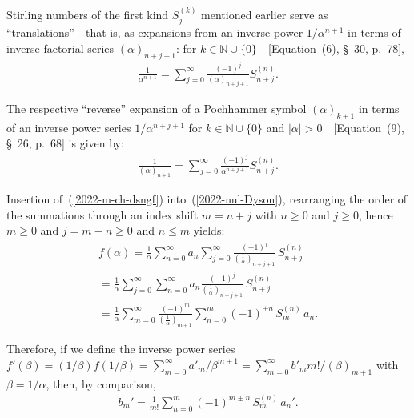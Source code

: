\documentclass[axioms,article,accept,oneauthor,pdftex]{Definitions/mdpi}
\begin{document}
Stirling numbers of the first kind ${S}_j^{(k)}$ mentioned earlier
serve as ``translations''---that is, as expansions from
an  inverse  power ${1}/{ \alpha ^{n+1}}$ in terms of  inverse  factorial series $( \alpha )_{n+j+1}$:
for $k  \in \mathbb{N} \cup \{0\}$~\cite{Nielsen-Gammafunktion}~[Equation~(6), \S~30, p.~78],
\begin{equation}
\begin{split}
\frac{1}{ \alpha ^{n+1}}  = \sum_{j=0}^\infty \frac{(-1)^j}{( \alpha )_{n+j+1}} {S}_{n+j}^{(n)}
.
\end{split}
\label{2022-m-ch-dsngf}
\end{equation}

The respective ``reverse'' expansion of a Pochhammer symbol $( \alpha )_{k+1}$ in terms of  an inverse power series
${1}/{ \alpha ^{n+j+1}}$
for $k  \in \mathbb{N} \cup \{0\}$ and $\vert \alpha \vert >0$~\cite{Nielsen-Gammafunktion}~[Equation~(9), \S~26, p.~68]
is given by:
\begin{equation}
\begin{split}
\frac{1}{( \alpha )_{n+1}}  = \sum_{j=0}^\infty \frac{(-1)^j}{\alpha^{n+j+1}} {S}_{n+j}^{(n)}
.
\end{split}
\label{2022-m-ch-dsngfinverse}
\end{equation}



Insertion of~(\ref{2022-m-ch-dsngf})  into~(\ref{2022-nul-Dyson}), rearranging the order of the summations through an index shift $m = n+j$
 with $n \ge 0$  and $j \ge 0$, hence  $m \ge 0$ and $j = m - n \ge 0$ and $n \le m$     yields:
\begin{equation}
\begin{split}
f\left(  \alpha  \right)
=  \frac{1}{\alpha}  \sum_{n=0}^\infty a_n \sum_{j=0}^\infty \frac{(-1)^j}{\left(\frac{1}{\alpha}\right)_{n+j+1}} \, {S}_{n+j}^{(n)}
\\
=  \frac{1}{\alpha} \sum_{j=0}^\infty \sum_{n=0}^\infty a_n \frac{(-1)^j}{\left(\frac{1}{\alpha}\right)_{n+j+1}} \, {S}_{n+j}^{(n)}
\\
=  \frac{1}{\alpha} \sum_{m=0}^\infty   \frac{(-1)^m}{\left(\frac{1}{\alpha}\right)_{m+1}} \sum_{n=0}^m (-1)^{\pm n} \, {S}_{m}^{(n)} \,  a_n
.
\end{split}
\label{2022-m-ch-dsinv2}
\end{equation}

Therefore, if we define the inverse power series
$
f'(\beta )
= (1/\beta ) f(1/\beta )=\sum_{m=0}^\infty a'_m/\beta^{m+1}
= \sum_{m=0}^\infty b'_m {m!}/(\beta)_{m+1}
$ with $\beta =1/\alpha$,
then, by comparison,
\begin{equation}
\begin{split}
b_m'= \frac{1}{m!} \sum_{n=0}^m (-1)^{m\pm n} \, {S}_{m}^{(n)} \,  a_n'
.
\end{split}
\label{2022-m-ch-comp}
\end{equation}
\end{document}
